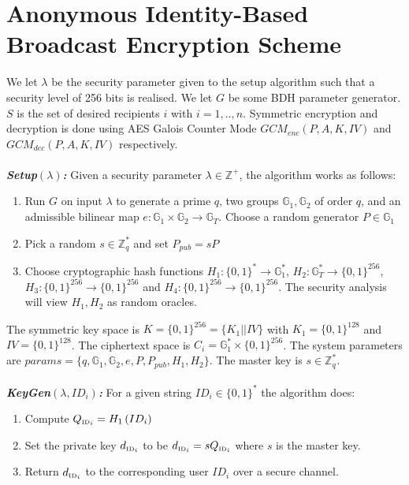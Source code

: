 \documentclass[11pt]{article}
\begin{document}
\section*{Anonymous Identity-Based Broadcast Encryption Scheme}
We let $\lambda$ be the security parameter given to the setup algorithm such that a security level of 256 bits is realised. We let $G$ be some BDH parameter generator. $S$ is the set of desired recipients $i$ with $i = 1,..,n$. Symmetric encryption and decryption is done using AES Galois Counter Mode  $GCM_{enc} \left( P, A, K, IV \right)$ and  $GCM_{dec} \left( P, A, K, IV \right)$ respectively.\\
\\
\textbf{\textit{Setup$\left( \lambda \right)$:}} Given a security parameter $\lambda \in \mathds{Z}^{+}$, the algorithm works as follows:
\begin{enumerate}
 \item Run $G$ on input $\lambda$ to generate a prime $q$, two groups $\mathds{G}_1, \mathds{G}_2$ of order $q$, and an admissible bilinear map $e: \mathds{G}_1 \times \mathds{G}_2 \rightarrow \mathds{G}_T$. Choose a random generator $P \in \mathds{G}_1$
 \item Pick a random $s \in \mathds{Z}^{*}_q$ and set $P_{pub} = sP$
 \item Choose cryptographic hash functions $H_1: \{ 0,1 \}^{*} \rightarrow \mathds{G}_1^{*}$, $H_2: \mathds{G}_T^{*} \rightarrow \{ 0,1 \}^{256}$, $H_3: \{ 0, 1 \}^{256} \rightarrow \{ 0,1 \}^{256}$ and $H_4: \{ 0, 1 \}^{256} \rightarrow \{ 0,1 \}^{256}$. The security analysis will view $H_1, H_2$ as random oracles.
\end{enumerate}

The symmetric key space is $K = \{ 0,1 \}^{256} = \{ K_1 || IV \}$ with $K_1 = \{ 0,1 \}^{128}$ and $IV = \{ 0,1 \}^{128}$. The ciphertext space is $C_i = \mathds{G}_1^{*} \times \{ 0,1 \}^{256}$. The system parameters are $params = \{ q, \mathds{G}_1, \mathds{G}_2, e, P, P_{pub}, H_1, H_2  \}$. The master key is $s \in \mathds{Z}_q^{*}$.\\
\\
\textbf{\textit{KeyGen$\left( \lambda,ID_i \right)$:}} For a given string $ID_i \in \{ 0,1 \}^{*}$ the algorithm does:
\begin{enumerate}
 \item Compute $Q_{\textrm{\tiny{ID}}_i} = H_1 \left( ID_{i} \right)$
 \item Set the private key $d_{\textrm{\tiny{ID}}_i}$ to be $d_{\textrm{\tiny{ID}}_i} = s Q_{\textrm{\tiny{ID}}_i}$ where $s$ is the master key.
 \item Return $d_{\textrm{\tiny{ID}}_i}$ to the corresponding user $ID_i$ over a secure channel.
\end{enumerate}
\end{document}
